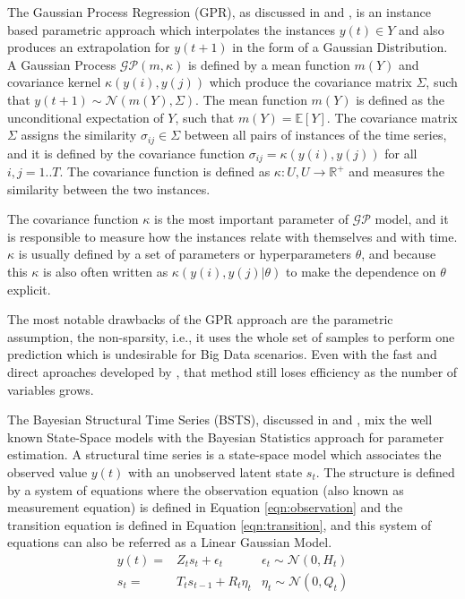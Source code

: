 The Gaussian Process Regression (GPR), as discussed in \cite{Rasmussen2006} and \cite{Roberts2013}, is an instance based parametric approach which interpolates the instances $y(t) \in Y$ and also produces an extrapolation for $y(t+1)$ in the form of a Gaussian Distribution. A Gaussian Process $\mathcal{GP}(m,\kappa)$ is defined by a mean function $m(Y)$ and covariance kernel $\kappa(y(i),y(j))$ which produce the covariance matrix $\Sigma$, such that $y(t+1) \sim \mathcal{N}(m(Y),\Sigma)$. The mean function $m(Y)$ is defined as the unconditional expectation of $Y$, such that $m(Y) = \mathbb{E}[Y]$. The covariance matrix $\Sigma$ assigns the similarity $\sigma_{ij} \in \Sigma$ between all pairs of instances of the time series, and it is defined by the covariance function $\sigma_{ij} = \kappa(y(i),y(j))$ for all $i,j = 1..T$. The covariance function is defined as $\kappa: U,U \rightarrow \mathbb{R}^+$ and measures the similarity between the two instances. 

The covariance function $\kappa$ is the most important parameter of $\mathcal{GP}$ model, and it is responsible to measure how the instances relate with themselves and with time. $\kappa$ is usually defined by a set of parameters or hyperparameters $\theta$, and because this $\kappa$ is also often written as $\kappa(y(i),y(j)|\theta)$ to make the dependence on $\theta$ explicit. 

The most notable drawbacks of the GPR approach are the parametric assumption, the non-sparsity, i.e., it uses the whole set of samples to perform one prediction which is undesirable for Big Data scenarios. Even with the fast and direct aproaches developed by \cite{Ambikasaran2014}, that method still loses efficiency as the number of variables grows.


The Bayesian Structural Time Series (BSTS), discussed in \cite{Scott2014} and \cite{Barber2011a}, mix the well known State-Space models with the Bayesian Statistics approach for parameter estimation. A structural time series is a state-space model which associates the observed value $y(t)$ with an unobserved latent state  $s_t$. The structure is defined by a system of equations where the observation equation (also known as measurement equation) is defined in Equation \eqref{eqn:observation} and the transition equation is defined in Equation \eqref{eqn:transition}, and this system of equations can also be referred as a Linear Gaussian Model. 
\begin{align}
    y(t)  = & Z_ts_t + \epsilon_t & \epsilon_t \sim \mathcal{N}(0, H_t) \label{eqn:observation} \\
    s_t  = & T_t s_{t-1} + R_t\eta_t & \eta_t \sim \mathcal{N}(0, Q_t)  \label{eqn:transition}
\end{align}

